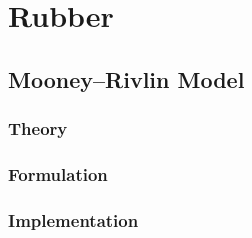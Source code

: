 \chapter{Rubber}
\section{Mooney--Rivlin Model}
\subsection{Theory}
\subsection{Formulation}
\subsection{Implementation}

